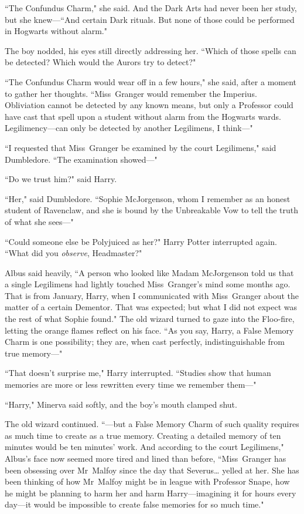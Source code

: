``The Confundus Charm," she said. And the Dark Arts had never been her study, but she knew—``And certain Dark rituals. But none of those could be performed in Hogwarts without alarm."

The boy nodded, his eyes still directly addressing her. ``Which of those spells can be detected? Which would the Aurors try to detect?"

``The Confundus Charm would wear off in a few hours," she said, after a moment to gather her thoughts. ``Miss~Granger would remember the Imperius. Obliviation cannot be detected by any known means, but only a Professor could have cast that spell upon a student without alarm from the Hogwarts wards. Legilimency—can only be detected by another Legilimens, I think—"

``I requested that Miss~Granger be examined by the court Legilimens," said Dumbledore. ``The examination showed—"

``Do we trust him?" said Harry.

``Her," said Dumbledore. ``Sophie McJorgenson, whom I remember as an honest student of Ravenclaw, and she is bound by the Unbreakable Vow to tell the truth of what she sees—"

``Could someone else be Polyjuiced as her?" Harry Potter interrupted again. ``What did you \emph{observe}, Headmaster?"

Albus said heavily, ``A person who looked like Madam McJorgenson told us that a single Legilimens had lightly touched Miss~Granger's mind some months ago. That is from January, Harry, when I communicated with Miss~Granger about the matter of a certain Dementor. That was expected; but what I did not expect was the rest of what Sophie found." The old wizard turned to gaze into the Floo-fire, letting the orange flames reflect on his face. ``As you say, Harry, a False Memory Charm is one possibility; they are, when cast perfectly, indistinguishable from true memory—"

``That doesn't surprise me," Harry interrupted. ``Studies show that human memories are more or less rewritten every time we remember them—"

``Harry," Minerva said softly, and the boy's mouth clamped shut.

The old wizard continued. ``—but a False Memory Charm of such quality requires as much time to create as a true memory. Creating a detailed memory of ten minutes would be ten minutes' work. And according to the court Legilimens," Albus's face now seemed more tired and lined than before, ``Miss~Granger has been obsessing over Mr~Malfoy since the day that Severus{\ldots} yelled at her. She has been thinking of how Mr~Malfoy might be in league with Professor Snape, how he might be planning to harm her and harm Harry—imagining it for hours every day—it would be impossible to create false memories for so much time."


